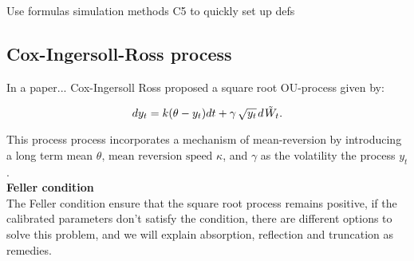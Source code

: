 Use formulas simulation methods C5 to quickly set up defs\\

\subsection{Cox-Ingersoll-Ross process}

In a paper... Cox-Ingersoll Ross proposed a square root OU-process given by:

$$ dy_t = k(\theta - y_t) dt + \gamma\,\sqrt{y_t}\hspace{0.1em} d \hspace{0.1em} \tilde{W}_t.$$

This process process incorporates a mechanism of mean-reversion by introducing a long term mean $\theta \text{, mean reversion speed }\kappa$, and $\gamma$ as the volatility the process $y_t $.\\

\textbf{Feller condition\\}
The Feller condition ensure that the square root process remains positive, if the calibrated parameters don't satisfy the condition, there are different options to solve this problem, and we will explain absorption, reflection and truncation as remedies.

